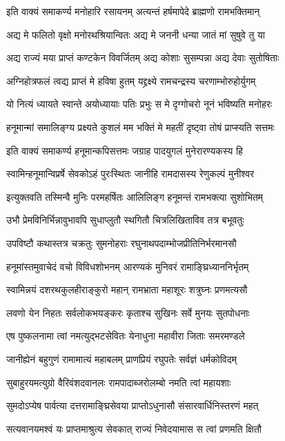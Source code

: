 \twolineshloka
{इति वाक्यं समाकर्ण्य मनोहारि रसायनम्}
{अत्यन्तं हर्षमापेदे ब्राह्मणो रामभक्तिमान्}%

\twolineshloka
{अद्य मे फलितो वृक्षो मनोरथश्रियान्वितः}
{अद्य मे जननी धन्या जातं मां सुषुवे तु या}%

\twolineshloka
{अद्य राज्यं मया प्राप्तं कण्टकेन विवर्जितम्}
{अद्य कोशाः सुसम्पन्ना अद्य देवाः सुतोषिताः}%

\twolineshloka
{अग्निहोत्रफलं त्वद्य प्राप्तं मे हविषा हुतम्}
{यद्द्रक्ष्ये रामचन्द्रस्य चरणाम्भोरुहोर्युगम्}%

\twolineshloka
{यो नित्यं ध्यायते स्वान्ते अयोध्यायाः पतिः प्रभुः}
{स मे दृग्गोचरो नूनं भविष्यति मनोहरः}%

\twolineshloka
{हनूमान्मां समालिङ्ग्य प्रक्ष्यते कुशलं मम}
{भक्तिं मे महतीं दृष्ट्वा तोषं प्राप्स्यति सत्तमः}%

\twolineshloka
{इति वाक्यं समाकर्ण्य हनूमान्कपिसत्तमः}
{जग्राह पादयुगलं मुनेरारण्यकस्य हि}%

\twolineshloka
{स्वामिन्हनूमान्विप्रर्षे सेवकोऽहं पुरःस्थितः}
{जानीहि रामदासस्य रेणुकल्पं मुनीश्वर}%

\twolineshloka
{इत्युक्तवति तस्मिन्वै मुनिः परमहर्षितः}
{आलिलिङ्ग हनूमन्तं रामभक्त्या सुशोभितम्}%

\twolineshloka
{उभौ प्रेमविनिर्भिन्नावुभावपि सुधाप्लुतौ}
{स्थगितौ चित्रलिखिताविव तत्र बभूवतुः}%

\twolineshloka
{उपविष्टौ कथास्तत्र चक्रतुः सुमनोहराः}
{रघुनाथपदाम्भोजप्रीतिनिर्भरमानसौ}%

\twolineshloka
{हनूमांस्तमुवाचेदं वचो विविधशोभनम्}
{आरण्यकं मुनिवरं रामाङ्घ्रिध्याननिर्भृतम्}%

\twolineshloka
{स्वामिन्नयं दशरथकुलहीराङ्कुरो महान्}
{रामभ्राता महाशूरः शत्रुघ्नः प्रणमत्यसौ}%

\twolineshloka
{लवणो येन निहतः सर्वलोकभयङ्करः}
{कृताश्च सुखिनः सर्वे मुनयः सुतपोधनाः}%

\twolineshloka
{एष पुष्कलनामा त्वां नमत्युद्भटसेवितः}
{येनाधुना महावीरा जिताः समरमण्डले}%

\twolineshloka
{जानीह्येनं बहुगुणं रामामात्यं महाबलम्}
{प्राणप्रियं रघुपतेः सर्वज्ञं धर्मकोविदम्}%

\twolineshloka
{सुबाहुरयमत्युग्रो वैरिवंशदवानलः}
{रामपादाब्जरोलम्बो नमति त्वां महायशाः}%

\twolineshloka
{सुमदोऽप्येष पार्वत्या दत्तरामाङ्घ्रिसेवया}
{प्राप्तोऽधुनासौ संसारवार्धिनिस्तरणं महत्}%

\twolineshloka
{सत्यवानयमश्वं यः प्राप्तमाश्रुत्य सेवकात्}
{राज्यं निवेदयामास स त्वां प्रणमति क्षितौ}%

